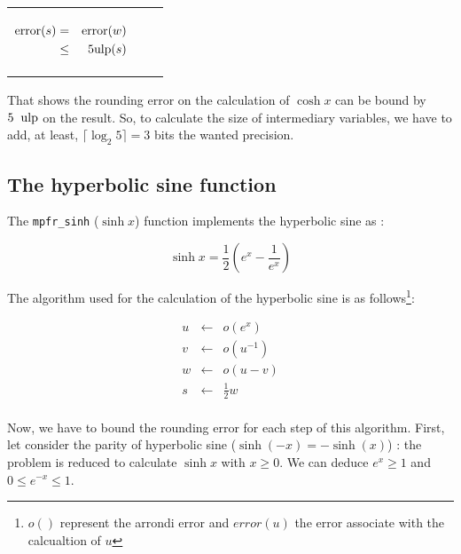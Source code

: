 \documentclass[12pt]{amsart}
\def\ulp{{\rm ulp}}
\begin{document}
\begin{center}
\begin{tabular}{l|l |l}
\begin{minipage}{7.5cm}
\begin{center}


\begin{eqnarray}\nonumber
 {\textnormal{error}}(s) & = &  {\textnormal{error}}(w)\\\nonumber
 & \leq &  5\ulp(s)
\end{eqnarray}



\end{center}

\end{minipage} &
\begin{minipage}{6cm}


\end{minipage}


\end{tabular}
\end{center}

That shows the rounding error on the calculation of $\cosh x$ can be
bound by $5 \;\; \ulp$ on the result. So, to calculate the size of
intermediary variables, we have to add, at least, $\lceil \log_2 5 \rceil=3$ bits the wanted
precision.
 

\subsection{The hyperbolic sine function}

The {\tt mpfr\_sinh} ($\sinh{x}$) function implements the hyperbolic
sine as :

$$
\sinh x = \frac{1}{2} \left( e^{x} - \frac{1}{e^x} \right) 
$$

The algorithm used for the calculation of the hyperbolic sine is as follows\footnote{$o()$ represent the arrondi error and $error(u)$ the
  error associate with the calcualtion of $u$}:

\begin{eqnarray}\nonumber
u&\leftarrow&o(e^x)\\\label{sinhalgo1}
v&\leftarrow&o({u}^{-1})\\\label{sinhalgo2}
w&\leftarrow&o(u-v)\\\label{sinhalgo3}
s&\leftarrow&\frac{1}{2} w\\\label{sinhalgo4}
\end{eqnarray}

Now, we have to bound the rounding error for each step of this
algorithm.  First, let consider the parity of hyperbolic sine
($\sinh(-x)=-\sinh(x)$) : the problem is reduced to calculate $\sinh x$
with $x \geq 0$. We can deduce $e^x \geq 1$ and $0 \leq e^{-x} \leq
1$.
\end{document}
